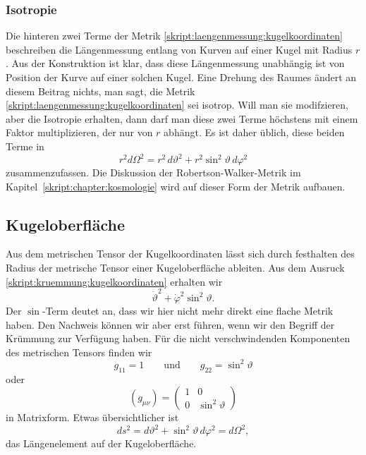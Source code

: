 \subsubsection{Isotropie}
%
Die hinteren zwei Terme der Metrik
\eqref{skript:laengenmessung:kugelkoordinaten}
beschreiben die Längenmessung entlang von Kurven auf einer Kugel mit Radius $r$.
Aus der Konstruktion ist klar, dass diese Längenmessung unabhängig ist
von Position der Kurve auf einer solchen Kugel.
Eine Drehung des Raumes ändert an diesem Beitrag nichts, man sagt, die
Metrik \eqref{skript:laengenmessung:kugelkoordinaten} sei isotrop.
%
Will man sie modifzieren, aber die Isotropie erhalten, dann darf man
diese zwei Terme höchstens mit einem Faktor multiplizieren, der nur von $r$
abhängt.
Es ist daher üblich, diese beiden Terme in
\begin{equation}
r^2 d\Omega^2
=
r^2\,d\vartheta^2 + r^2\sin^2\vartheta\,d\varphi^2
\label{skript:laengenmessung:omega2}
\end{equation}
zusammenzufassen.
Die Diskussion der Robertson-Walker-Metrik im
Kapitel~\ref{skript:chapter:kosmologie} wird auf dieser Form der Metrik
aufbauen.

\subsection{Kugeloberfläche}
Aus dem metrischen Tensor der Kugelkoordinaten lässt sich durch festhalten
des Radius der metrische Tensor einer Kugeloberfläche ableiten.
Aus dem Ausruck \eqref{skript:kruemmung:kugelkoordinaten}
erhalten wir
\[
\dot\vartheta^2+\dot\varphi^2\sin^2\vartheta.
\]
Der $\sin$-Term deutet an, dass wir hier nicht mehr direkt eine flache
Metrik haben.
Den Nachweis können wir aber erst führen, wenn wir den Begriff der
Krümmung zur Verfügung haben.
Für die nicht verschwindenden Komponenten des metrischen Tensors
finden wir
\[
g_{11} = 1
\qquad\text{und}\qquad
g_{22}=\sin^2\vartheta
\]
oder
\[
(g_{\mu\nu})
=
\begin{pmatrix}
1&0\\
0&\sin^2\vartheta
\end{pmatrix}
\]
in Matrixform.
Etwas übersichtlicher ist 
\begin{equation}
ds^2
=
d\vartheta^2 + \sin^2\vartheta\,d\varphi^2
=
d\Omega^2,
\label{skript:laengenmessung:kugeloberflaeche}
\end{equation}
das Längenelement auf der Kugeloberfläche.
%

